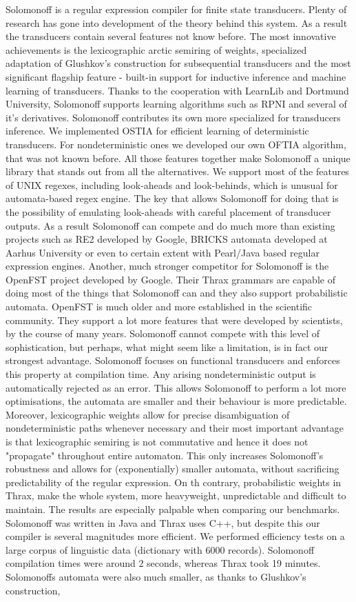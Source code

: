 Solomonoff is a regular expression compiler for finite state transducers. Plenty of research has gone into development of the theory behind this system. As a result the transducers contain several features not know before. The most innovative achievements is the lexicographic arctic semiring of weights, specialized adaptation of Glushkov's construction for subsequential transducers and the most significant flagship feature - built-in support for inductive inference and machine learning of transducers. Thanks to the cooperation with LearnLib and Dortmund University, Solomonoff supports learning algorithms such as RPNI and several of it's  derivatives. Solomonoff contributes its own more specialized for transducers inference. We implemented OSTIA for efficient learning of deterministic transducers. For nondeterministic ones we developed our own OFTIA algorithm, that was not known before. All those features together make Solomonoff a unique library that stands out from all the alternatives. We support most of the features of UNIX regexes, including look-aheads and look-behinds, which is unusual for automata-based regex engine. The key that allows Solomonoff for doing that is the possibility of emulating look-aheads with careful placement of transducer outputs. As a result Solomonoff can compete and  do much more than existing projects such as RE2 developed by Google, BRICKS automata developed at  Aarhus University or even to certain extent with Pearl/Java based regular expression engines. Another, much stronger competitor for Solomonoff is the OpenFST project developed by Google. Their Thrax grammars are capable of doing most of the things that Solomonoff can and they also support probabilistic automata. OpenFST is much older and more established in the scientific community. They support a lot more features that were developed by scientists, by the course of many years. Solomonoff cannot compete with this level of sophistication, but perhaps, what might seem like a limitation, is in fact our strongest advantage. Solomonoff focuses on functional transducers and enforces this property at compilation time. Any arising nondeterministic output is automatically rejected as an error. This allows Solomonoff to perform a lot more optimisations, the automata are smaller and their behaviour is more predictable. Moreover, lexicographic weights allow for precise disambiguation of nondeterministic paths whenever necessary and their most important advantage is that lexicographic semiring is not commutative and hence it does not "propagate" throughout entire automaton. This only increases Solomonoff's robustness and allows for (exponentially) smaller automata, without sacrificing predictability of the regular expression. On th contrary, probabilistic weights in Thrax, make the whole system, more heavyweight, unpredictable and difficult to maintain. The results are especially palpable when comparing our benchmarks. Solomonoff was written in Java and Thrax uses C++, but despite this our compiler is several magnitudes more efficient. We performed efficiency tests on a large corpus of linguistic data (dictionary with 6000 records). Solomonoff compilation times were around 2 seconds, whereas Thrax took 19 minutes. Solomonoffs automata were also much smaller, as thanks to Glushkov's construction, 